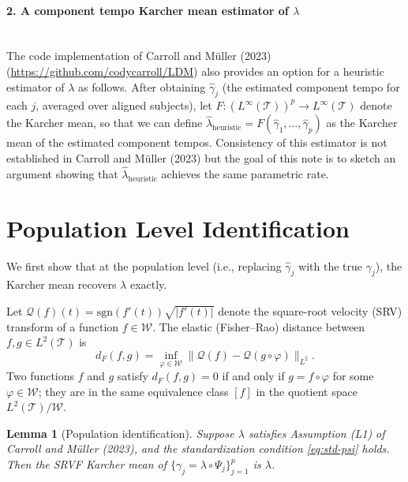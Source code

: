 \documentclass[11pt]{article}
\newtheorem{lemma}[theorem]{Lemma}
\theoremstyle{definition}
\newcommand{\T}{\mathcal{T}}
\newcommand{\W}{\mathcal{W}}
\newcommand{\lhat}{\hat{\lambda}}
\newcommand{\ghat}{\hat{\gamma}}
\newcommand{\SQ}{\mathcal{Q}} %
\begin{document}
\paragraph{2. A component tempo Karcher mean estimator of $\lambda$}
~\\
The code implementation of Carroll and M\"{u}ller (2023) (\url{https://github.com/codycarroll/LDM}) also provides an option for a heuristic estimator of $\lambda$ as follows.
After obtaining $\ghat_j$ (the estimated component tempo for each $j$,
averaged over aligned subjects), let $F : (L^\infty(\T))^p \to L^\infty(\T)$ denote the Karcher mean,
so that we can define
$\lhat_{\mathrm{heuristic}} = F(\ghat_1,\ldots,\ghat_p)$ as the Karcher mean of the estimated component tempos. Consistency of this estimator is not established in Carroll and M\"{u}ller (2023) but the goal of this note is to sketch an argument showing that
$\lhat_{\mathrm{heuristic}}$ achieves the same parametric rate.

\section*{Population Level Identification}

We first show that at the population level (i.e., replacing $\ghat_j$ with
the true $\gamma_j$), the Karcher mean recovers $\lambda$ exactly.

Let $\SQ(f)(t) = \mathrm{sgn}(f'(t))\sqrt{|f'(t)|}$ denote the square-root
velocity (SRV) transform of a function $f \in \W$. The elastic (Fisher--Rao)
distance between $f, g \in L^2(\T)$ is
\[
  d_F(f, g) = \inf_{\varphi \in \W} \|\SQ(f) - \SQ(g \circ \varphi)\|_{L^2}.
\]
Two functions $f$ and $g$ satisfy $d_F(f, g) = 0$ if and only if
$g = f \circ \varphi$ for some $\varphi \in \W$; they are in the same
equivalence class $[f]$ in the quotient space $L^2(\T)/\W$.

\begin{lemma}[Population identification]
  \label{lem:pop}
  Suppose $\lambda$ satisfies Assumption (L1) of Carroll and M\"{u}ller (2023),
  and the standardization condition \eqref{eq:std-psi} holds.
  Then the SRVF Karcher mean of $\{\gamma_j = \lambda \circ \Psi_j\}_{j=1}^p$
  is $\lambda$.
\end{lemma}
\end{document}
